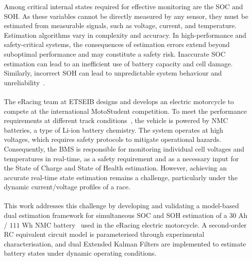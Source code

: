 Among critical internal states required for effective monitoring are the \ac{SOC} and \ac{SOH}. 
As these variables cannot be directly measured by any sensor, they must be estimated from measurable
signals, such as voltage, current, and temperature. Estimation algorithms vary in complexity and accuracy. 
In high-performance and 
safety-critical systems, the consequences of estimation errors extend beyond suboptimal performance and 
may constitute a safety risk. Inaccurate \ac{SOC} estimation can 
lead to an inefficient use of battery capacity and cell damage. Similarly, incorrect \ac{SOH} can lead to unpredictable system 
behaviour and unreliability~\cite{plett2015battery}.
\\
\\
The eRacing team at ETSEIB designs and develops an electric motorcycle to compete at the international MotoStudent competition.
To meet the performance requirements at different track conditions~\cite{MotoStudent2026Regulations}, the vehicle is powered by \ac{NMC} 
batteries, a type of \ac{Li-ion} battery chemistry. The system operates at high voltages, which requires safety protocols to mitigate operational 
hazards. 
Consequently, the \ac{BMS} is responsible for monitoring individual cell voltages and temperatures in real-time, as a safety requirement and
as a necessary input for the State of Charge and State of Health estimation. However, achieving an accurate real-time state estimation 
remains a challenge, 
particularly under the dynamic current/voltage profiles of a race.
\\
\\
This work addresses this challenge by developing and validating a model-based dual estimation framework for simultaneous 
\ac{SOC} and \ac{SOH} estimation of a $30$ Ah / $111$ Wh \ac{NMC} battery~\cite{welion2026shp270} used in the eRacing electric motorcycle. 
A second-order RC equivalent circuit model is parameterised through experimental characterisation, and dual 
Extended Kalman Filters are implemented to estimate battery states under dynamic operating conditions.
